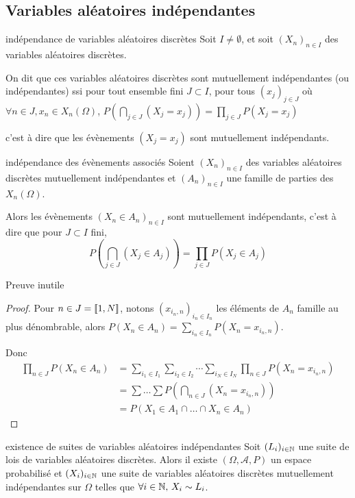 \subsection{Variables aléatoires indépendantes }

\begin{definition}{indépendance de variables aléatoires discrètes}{}
    Soit $I \neq \emptyset$, et soit $(X_n)_{n \in I}$ des variables aléatoires discrètes. 

    On dit que ces variables aléatoires discrètes sont mutuellement indépendantes
    (ou indépendantes) ssi pour tout ensemble fini $J \subset I$, pour tous 
    $(x_j)_{j \in J}$ où $\forall n \in J, x_n \in X_n(\Omega)$, 
    $\displaystyle P\left( \bigcap_{j \in J} (X_j = x_j) \right) = \prod_{j \in J} P(X_j = x_j)$

    c'est à dire que les évènements $(X_j = x_j)$ sont mutuellement indépendants.
\end{definition}


\begin{proposition}{indépendance des évènements associés}{}
    Soient $(X_n)_{n \in I}$ des variables aléatoires discrètes mutuellement indépendantes et 
    $(A_n)_{n \in I}$ une famille de parties des $X_n(\Omega)$. 

    Alors les évènements $(X_n \in A_n)_{n \in I}$ sont mutuellement indépendants, c'est à dire que pour 
    $J \subset I$ fini, $$ P\left( \bigcap_{j \in J} (X_j \in A_j) \right) = \prod_{j \in J} P(X_j \in A_j) $$
\end{proposition}

Preuve inutile 
 
\begin{proof}
    Pour $n \in J = [\![1, N]\!]$, notons 
    $(x_{i_n, n})_{i_n \in I_n}$ les éléments de $A_n$ famille au plus dénombrable, alors 
    $P(X_n \in A_n) = \sum_{i_n \in I_n} P(X_n = x_{i_n, n})$.

    Donc 
    \begin{align}
        \prod_{n \in J} P(X_n \in A_n) & = \sum_{i_1 \in I_1} \sum_{i_2 \in I_2} \cdots \sum_{i_N \in I_N} \prod_{n \in J} P(X_n = x_{i_n, n}) \\
        & = \sum \dots \sum P(\bigcap_{n \in J} (X_n = x_{i_n, n})) \\
        & = P(X_1 \in A_1 \cap \dots \cap X_n \in A_n)
    \end{align}
\end{proof}

\begin{theoreme}{existence de suites de variables aléatoires indépendantes}{}
    Soit $(L_i)_{i \in \mathbb{N}}$ une suite de lois de variables aléatoires discrètes. Alors il existe 
    $(\Omega, \mathcal A, P)$ un espace probabilisé et $(X_i)_{i \in \mathbb{N}}$ une suite de variables aléatoires discrètes mutuellement indépendantes
    sur $\Omega$ telles que $\forall i \in \mathbb{N}, \, X_i \sim L_i$. 
\end{theoreme}

